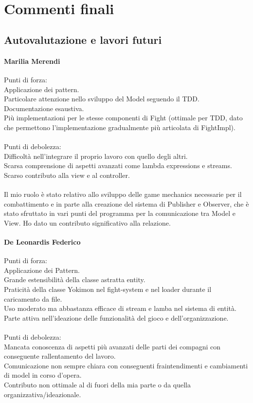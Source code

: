 \documentclass[a4paper,12pt]{report}
\begin{document}
\chapter{Commenti finali}
\section{Autovalutazione e lavori futuri}
\subsubsection{Marilia Merendi}
Punti di forza: \\
%
Applicazione dei pattern. \\
%
Particolare attenzione nello sviluppo del Model seguendo il TDD. \\
%
Documentazione esaustiva. \\
%
Più implementazioni per le stesse componenti di Fight (ottimale per TDD, dato che permettono l’implementazione gradualmente più articolata di FightImpl). \\
\\
Punti di debolezza: \\
%
Difficoltà nell’integrare il proprio lavoro con quello degli altri. \\
%
Scarsa comprensione di aspetti avanzati come lambda expressions e streams. \\
%
Scarso contributo alla view e al controller. \\
\\
Il mio ruolo è stato relativo allo sviluppo delle game mechanics necessarie per il combattimento e in parte alla creazione del sistema di Publisher e Observer, che è stato sfruttato in vari punti del programma per la comunicazione tra Model e View.
%
Ho dato un contributo significativo alla relazione.
\subsubsection{De Leonardis Federico}
Punti di forza: \\
%
Applicazione dei Pattern. \\
%
Grande estensibilità della classe astratta entity. \\
%
Praticità della classe Yokimon nel fight-system e nel loader durante il caricamento da file. \\
%
Uso moderato ma abbastanza efficace di stream e lamba nel sistema di entità. \\
%
Parte attiva nell’ideazione delle funzionalità del gioco e dell’organizzazione. \\
\\
Punti di debolezza: \\
%
Mancata conoscenza di aspetti più avanzati delle parti dei compagni con conseguente rallentamento del lavoro. \\
%
Comunicazione non sempre chiara con conseguenti fraintendimenti e cambiamenti di model in corso d’opera. \\
%
Contributo non ottimale al di fuori della mia parte o da quella organizzativa/ideazionale. \\
\end{document}
